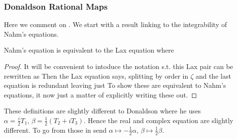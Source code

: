 \documentclass{article}
\begin{document}
\subsubsection{Donaldson Rational Maps}
Here we comment on \cite{Donaldson1984}. We start with a result linking to the integrability of Nahm's equations. 

\begin{prop}
	Nahm's equation is equivalent to the Lax equation 
	where 
\end{prop}
\begin{proof}
	It will be convenient to intoduce the notation 
	s.t. this Lax pair can be rewritten as 
	Then the Lax equation says, splitting by order in $\zeta$
	and the last equation is redundant leaving just
	To show these are equivalent to Nahm's equations, it now just a matter of explicitly writing these out. 
\end{proof}

\begin{remark}
	These definitions are slightly different to Donaldson where he uses $\alpha = \frac{i}{2}T_1, \, \beta = \frac{1}{2}(T_2+iT_3)$. Hence the real and complex equation are slightly different. To go from those in \cite{Donaldson1984} send $\alpha \mapsto -\frac{1}{2}\alpha, \, \beta \mapsto \frac{1}{2}\beta$.
\end{remark}
\end{document}
